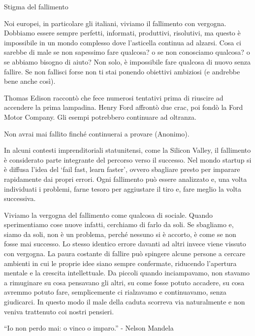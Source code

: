 \documentclass[12pt]{book} %
\begin{document}
\bigskip
\begin{mdframed}[linewidth=1pt]
Stigma del fallimento

Noi europei, in particolare gli italiani, viviamo il fallimento con vergogna. Dobbiamo essere sempre
perfetti, informati, produttivi, risolutivi, ma questo è impossibile in un mondo complesso dove
l'asticella continua ad alzarsi. Cosa ci sarebbe di male se non sapessimo fare qualcosa? o se non
conosciamo qualcosa? o se abbiamo bisogno di aiuto? Non solo, è impossibile fare qualcosa di nuovo senza fallire. Se non fallisci forse non ti stai ponendo obiettivi ambiziosi (e andrebbe bene anche così).

Thomas Edison raccontò che fece numerosi tentativi prima di riuscire ad accendere la prima lampadina. Henry Ford affrontò due crac, poi fondò la Ford Motor Company. Gli esempi potrebbero continuare ad oltranza.

Non avrai mai fallito finché continuerai a provare (Anonimo).

In alcuni contesti imprenditoriali statunitensi, come la Silicon Valley, il fallimento è considerato parte integrante del percorso verso il successo. Nel mondo startup si è diffusa l’idea del ‘fail fast, learn faster’, ovvero sbagliare presto per imparare rapidamente dai propri errori. Ogni
fallimento può essere analizzato e, una volta individuati i problemi, farne tesoro per aggiustare il tiro e, fare
meglio la volta successiva. 

Viviamo la vergogna del fallimento come qualcosa di sociale. Quando sperimentiamo cose nuove infatti, cerchiamo di farlo da soli. Se sbagliamo e, siamo da soli, non è un
problema, perché nessuno si è accorto, è come se non fosse mai successo. Lo stesso identico errore davanti ad altri
invece viene vissuto con vergogna. La paura costante di fallire può spingere alcune persone a cercare ambienti in cui le proprie idee siano sempre confermate, riducendo l’apertura mentale e la crescita intellettuale. Da piccoli quando inciampavamo,
non stavamo a rimuginare su cosa pensavano gli altri, su come fosse potuto accadere, su cosa avremmo potuto fare,
semplicemente ci rialzavamo e continuavamo, senza giudicarci. In questo modo il male della caduta scorreva via
naturalmente e non veniva trattenuto coi nostri pensieri. 

“Io non perdo mai: o vinco o imparo.” - Nelson Mandela 
\end{mdframed}

\bigskip
\end{document}
